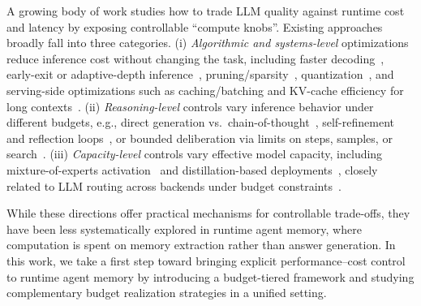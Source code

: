 A growing body of work studies how to trade LLM quality against runtime cost and latency by exposing controllable ``compute knobs''. Existing approaches broadly fall into three categories.
(i) \textit{Algorithmic and systems-level} optimizations reduce inference cost without changing the task, including faster decoding~\citep{fu2024break, cai2024medusa, li2024eagle}, early-exit or adaptive-depth inference~\citep{schuster2022confident}, pruning/sparsity~\citep{ma2023llm, frantar2023sparsegpt, sun2023simple}, quantization~\citep{xiao2023smoothquant, liu2024llm}, and serving-side optimizations such as caching/batching and KV-cache efficiency for long contexts~\citep{zhang2023h2o, xiao2023efficient, ge2023model, li2024snapkv}.
(ii) \textit{Reasoning-level} controls vary inference behavior under different budgets, e.g., direct generation vs.\ chain-of-thought~\citep{wei2022chain}, self-refinement and reflection loops~\citep{yao2022react, shinn2023reflexion, madaan2023self}, or bounded deliberation via limits on steps, samples, or search~\citep{wang2022self}.
(iii) \textit{Capacity-level} controls vary effective model capacity, including mixture-of-experts activation~\citep{shazeer2017outrageously, fedus2022switch} and distillation-based deployments~\citep{gu2023minillm, agarwal2024policy}, closely related to LLM routing across backends under budget constraints~\citep{chen2024routerdc, feng2024graphrouter, zhang2025router, jin2025controlling}.



While these directions offer practical mechanisms for controllable trade-offs, they have been less systematically explored in runtime agent memory, where computation is spent on memory extraction rather than answer generation.
In this work, we take a first step toward bringing explicit performance--cost control to runtime agent memory by introducing a budget-tiered framework and studying complementary budget realization strategies in a unified setting.



